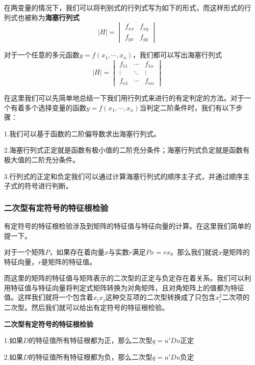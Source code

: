 \documentclass[UTF8,12pt]{ctexart}
\numberwithin{equation}{section} %
\numberwithin{figure}{section}
\numberwithin{table}{section}
\begin{document}
	在两变量的情况下，我们可以将判别式的行列式写为如下的形式，而这样形式的行列式也被称为\textbf{海塞行列式}
	\begin{equation}
		|H| =
		\begin{vmatrix}
			f_{xx} & f_{xy} \\
			f_{yx} & f_{yy}
		\end{vmatrix}
	\end{equation}
	
	对于一个任意的多元函数$y = f(x_1,\cdots,x_n)$，我们都可以写出海塞行列式
	\begin{equation}
		|H| =
		\begin{vmatrix}
			f_{11} &\cdots & f_{1n} \\
			\vdots & \ddots & \vdots \\
			f_{n1} & \cdots&f_{nn}
		\end{vmatrix}
	\end{equation}
	
	在这里我们可以先简单地总结一下我们用行列式来进行的有定判定的方法。对于一个有着多个选择变量的函数$y = f(x_1,\cdots,x_n)$当判定二阶条件时，我们有以下步骤：
	
	1.我们可以基于函数的二阶偏导数求出海塞行列式。
	
	2.海塞行列式正定就是函数有极小值的二阶充分条件；海塞行列式负定就是函数有极大值的二阶充分条件。
	
	3.行列式的正定和负定我们可以通过计算海塞行列式的顺序主子式，并通过顺序主子式的符号进行判断。
	
	\subsubsection{二次型有定符号的特征根检验}
	
	有定符号的特征根检验涉及到矩阵的特征值与特征向量的计算。在这里我们简单的提一下。
	
	对于一个矩阵$P$，如果存在着向量$x$与实数$r$满足$Px = rx$。那么我们就说$x$是矩阵的特征向量，$r$是矩阵的特征值。
	
	而这里的矩阵的特征值与矩阵表示的二次型的正定与负定存在着关系。我们可以利用特征值与特征向量将判定式矩阵转换为对角矩阵，且对角矩阵上的值都为特征值。这样我们就将一个包含着$x_ix_j$这种交互项的二次型转换成了只包含$x_i^2$二次项的二次型。然后我们就可以给出有定符号的特征根检验。
	
	\textbf{二次型有定符号的特征根检验}
	
	1.如果$D$的特征值所有特征根都为正，那么二次型$q = u'Du$正定
	
	2.如果$D$的特征值所有特征根都为负，那么二次型$q = u'Du$负定
	
\end{document}

